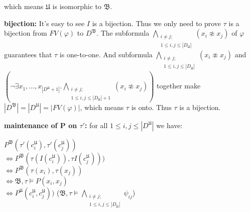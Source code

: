 \documentclass[12pt]{article}
\renewcommand{\phi}{\varphi}
\begin{document}
\begin{enumerate}
  which means $\mathfrak{U}$ is isomorphic to $\mathfrak{B}$.
  
  \textbf{bijection:} It's easy to see $I$ is a bijection. Thus we only need to prove $\tau$ is a bijection from $FV(\phi)$ to $D^{\mathfrak{B}}$. The subformula $\bigwedge_{\substack{i\neq j;\\1\le i,j\le|D_\mathfrak{U}|}}(x_i\not \approx x_j)$ of $\phi$ guarantees that $\tau$ is one-to-one. And subformula $\bigwedge_{\substack{i\neq j;\\1\le i,j\le|D_\mathfrak{U}|}}(x_i\not \approx x_j)$ and \\$(\neg \exists x_1,...,x_{|D^\mathfrak{U}+1|}. \bigwedge_{{\substack{i\neq j;\\1\le i,j\le|D_\mathfrak{U}|+1}}}(x_i\not \approx x_j)) $ together make $|D^{\mathfrak{B}}|=|D^{\mathfrak{U}}|=|FV(\phi)|$, which means $\tau$ is onto. Thus $\tau$ is a bijection.
  
  \textbf{maintenance of P on $\tau'$:} 
  for all $1\le i,j\le |D^{\mathfrak{U}}|$ we have:
  
  $P^{\mathfrak{B}}(\tau'(c_i^{\mathfrak{U}}),\tau'(c_j^{\mathfrak{U}}))$\\
  $\Leftrightarrow P^{\mathfrak{B}}(\tau(I(c_i^{\mathfrak{U}})),\tau I(c_j^{\mathfrak{U}})))$\\
    $\Leftrightarrow P^{\mathfrak{B}}(\tau(x_i),\tau( x_j))$\\
    $\Leftrightarrow \mathfrak{B},\tau\models P(x_i,x_j)$\\
     $\Leftrightarrow P^{\mathfrak{U}}(c_i^{\mathfrak{U}},c_j^{\mathfrak{U}}))$ ($\mathfrak{B},\tau\models \bigwedge_{\substack{i\neq j;\\1\le i,j\le|D_\mathfrak{U}|}}\psi_{ij}$)
     

\end{enumerate}
\end{document}
